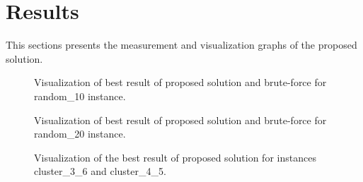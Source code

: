 \clearpage%
\newpage


\section{Results}\label{sec:results}
This sections presents the measurement and visualization graphs of the proposed solution.

\begin{figure}[h!]
    \centering

    \caption[Random\_10 instance solution visualization for brute-force]
        {Visualization of best result of proposed solution and brute-force for random\_10 instance.}
    \label{fig:visualization-random10}%
\end{figure}

\begin{figure}[h!]
    \centering

    \caption[Random\_10 instance solution visualization for proposed solution]
        {Visualization of best result of proposed solution and brute-force for random\_20 instance.}
    \label{fig:visualization-random20}%
\end{figure}
\clearpage%

\begin{figure}[h!]
    \centering

    \caption[Solution visualization of clustering instances for proposed solution]
    {Visualization of the best result of proposed solution for instances cluster\_3\_6 and cluster\_4\_5.}
    \label{fig:visualization-cluster}%
\end{figure}

